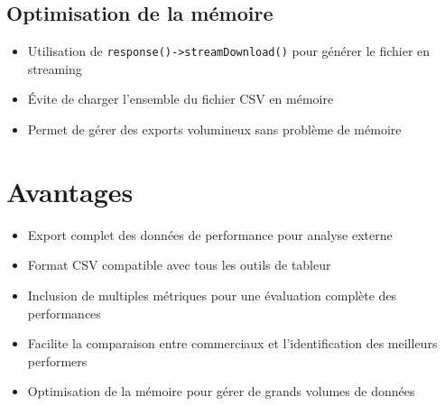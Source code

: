 \documentclass[12pt,a4paper]{article}
\begin{document}
\subsection{Optimisation de la mémoire}
\begin{itemize}
    \item Utilisation de \texttt{response()->streamDownload()} pour générer le fichier en streaming
    \item Évite de charger l'ensemble du fichier CSV en mémoire
    \item Permet de gérer des exports volumineux sans problème de mémoire
\end{itemize}

\section{Avantages}
\begin{itemize}
    \item Export complet des données de performance pour analyse externe
    \item Format CSV compatible avec tous les outils de tableur
    \item Inclusion de multiples métriques pour une évaluation complète des performances
    \item Facilite la comparaison entre commerciaux et l'identification des meilleurs performers
    \item Optimisation de la mémoire pour gérer de grands volumes de données
\end{itemize}
\end{document}
